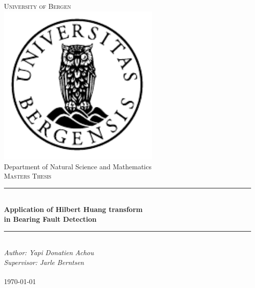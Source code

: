 \documentclass[../Main/thesis.tex]{subfiles}
\begin{document}

\newcommand{\HRule}{\rule{\linewidth}{0.5mm}}

\begin{titlepage}
\begin{center}
\textsc{\Huge University of Bergen}\\[0.4cm]
\includegraphics[width=8cm]{../fig/uib} \\[0.5cm]

\large Department of Natural Science and Mathematics\\[0.7cm]
\textsc{\huge Masters Thesis}\\[0.4cm]
\HRule \\[0.4cm]
{ \huge \bfseries Application of Hilbert Huang transform\\ in Bearing Fault Detection}\\[0.5cm]
\HRule \\[1.0cm]

\emph{Author: Yapi Donatien Achou}\\
\emph{Supervisor: Jarle Berntsen}\\

\paragraph*{}
\end{center}
\vfill
\begin{center}
{\large \today}
\end{center}
\end{titlepage}
\end{document}
